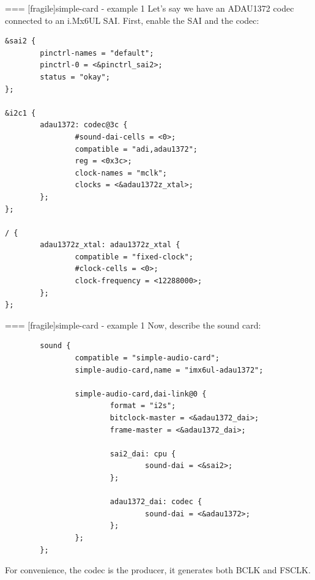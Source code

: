 === [fragile]{simple-card - example 1}
  Let's say we have an ADAU1372 codec connected to an i.Mx6UL SAI.
  First, enable the SAI and the codec:
  \begin{block}{}
    \fontsize{7}{6}\selectfont
    \begin{verbatim}
&sai2 {
        pinctrl-names = "default";
        pinctrl-0 = <&pinctrl_sai2>;
        status = "okay";
};

&i2c1 {
        adau1372: codec@3c {
                #sound-dai-cells = <0>;
                compatible = "adi,adau1372";
                reg = <0x3c>;
                clock-names = "mclk";
                clocks = <&adau1372z_xtal>;
        };
};

/ {
        adau1372z_xtal: adau1372z_xtal {
                compatible = "fixed-clock";
                #clock-cells = <0>;
                clock-frequency = <12288000>;
        };
};
    \end{verbatim}
  \end{block}


=== [fragile]{simple-card - example 1}
  Now, describe the sound card:
  \begin{block}{}
    \fontsize{7}{6}\selectfont
    \begin{verbatim}
        sound {
                compatible = "simple-audio-card";
                simple-audio-card,name = "imx6ul-adau1372";

                simple-audio-card,dai-link@0 {
                        format = "i2s";
                        bitclock-master = <&adau1372_dai>;
                        frame-master = <&adau1372_dai>;

                        sai2_dai: cpu {
                                sound-dai = <&sai2>;
                        };

                        adau1372_dai: codec {
                                sound-dai = <&adau1372>;
                        };
                };
        };
    \end{verbatim}
  \end{block}
  For convenience, the codec is the producer, it generates both BCLK and
  FSCLK.


